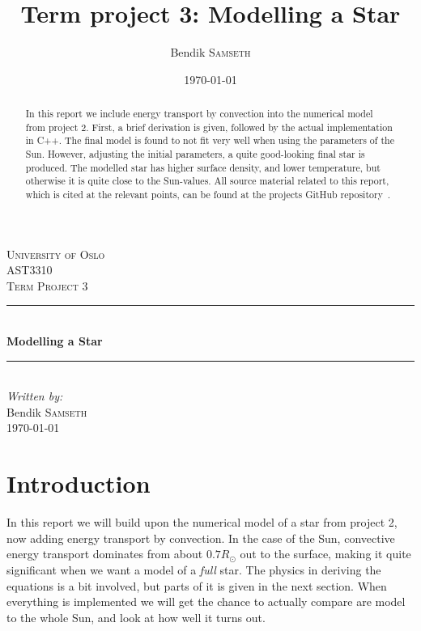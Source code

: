 \documentclass[11pt]{article}
\title{Term project 3: Modelling a Star}
\author{Bendik \textsc{Samseth}}
\date{\today}
\begin{document}
\begin{titlepage}
  \newcommand{\HRule}{\rule{\linewidth}{0.5mm}}
  \center
  \textsc{\LARGE University of Oslo}\\[1.5cm]
  \textsc{\Large AST3310}\\[0.5cm]
  \textsc{\large Term Project 3}\\[0.5cm]
  \HRule \\[0.4cm]
  { \huge \bfseries Modelling a Star}\\[0.4cm]
  \HRule \\[1.5cm]
  \Large \emph{Written by:}\\
  Bendik \textsc{Samseth}\\[3cm]
  {\large \today}\\[3cm]
  \vfill
\end{titlepage}


  \tableofcontents
  \begin{abstract}

    In this report we include energy transport by convection into the
    numerical model from project 2. First, a brief derivation is
    given, followed by the actual implementation in C++. The final
    model is found to not fit very well when using the parameters of
    the Sun. However, adjusting the initial parameters, a quite
    good-looking final star is produced. The modelled star has higher
    surface density, and lower temperature, but otherwise it is quite
    close to the Sun-values. All source material related to this
    report, which is cited at the relevant points, can be found at the
    projects GitHub repository~\cite{github}.

  \end{abstract}
\pagebreak



\section{Introduction}

In this report we will build upon the numerical model of a star from project 2, now adding energy transport by convection. In the case of the Sun, convective energy transport dominates from about $0.7R_\odot$ out to the surface, making it quite significant when we want a model of a \emph{full} star. The physics in deriving the equations is a bit involved, but parts of it is given in the next section. When everything is implemented we will get the chance to actually compare are model to the whole Sun, and look at how well it turns out.
\end{document}
